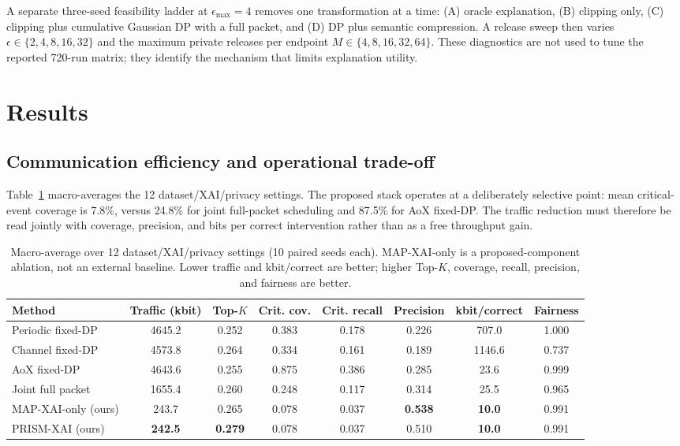 \documentclass[conference]{IEEEtran}
\newcommand{\method}{PRISM-XAI}
\newcommand{\mapxai}{MAP-XAI}
\begin{document}
A separate three-seed feasibility ladder at $\epsilon_{\max}=4$ removes
one transformation at a time: (A) oracle explanation, (B) clipping only,
(C) clipping plus cumulative Gaussian DP with a full packet, and (D) DP
plus semantic compression. A release sweep then varies
$\epsilon\in\{2,4,8,16,32\}$ and the maximum private releases per
endpoint $M\in\{4,8,16,32,64\}$. These diagnostics are not used to tune
the reported 720-run matrix; they identify the mechanism that limits
explanation utility.

\section{Results}

\subsection{Communication efficiency and operational trade-off}

Table~\ref{tab:main} macro-averages the 12 dataset/XAI/privacy settings.
The proposed stack operates at a deliberately selective point: mean
critical-event coverage is 7.8\%, versus 24.8\% for joint full-packet
scheduling and 87.5\% for AoX fixed-DP. The traffic reduction must
therefore be read jointly with coverage, precision, and bits per correct
intervention rather than as a free throughput gain.

\begin{table}[t]
\caption{Macro-average over 12 dataset/XAI/privacy settings (10 paired
seeds each). \mapxai{}-only is a proposed-component ablation, not an
external baseline. Lower traffic and kbit/correct are better; higher
Top-$K$, coverage, recall, precision, and fairness are better.}
\label{tab:main}
\centering
\footnotesize
\setlength{\tabcolsep}{4.1pt}
\begin{tabular}{lccccccc}
\toprule
Method & Traffic (kbit) & Top-$K$ & Crit. cov. & Crit. recall & Precision & kbit/correct & Fairness \\
\midrule
Periodic fixed-DP & 4645.2 & 0.252 & 0.383 & 0.178 & 0.226 & 707.0 & 1.000 \\
Channel fixed-DP & 4573.8 & 0.264 & 0.334 & 0.161 & 0.189 & 1146.6 & 0.737 \\
AoX fixed-DP & 4643.6 & 0.255 & 0.875 & 0.386 & 0.285 & 23.6 & 0.999 \\
Joint full packet & 1655.4 & 0.260 & 0.248 & 0.117 & 0.314 & 25.5 & 0.965 \\
\midrule
\mapxai{}-only (ours) & 243.7 & 0.265 & 0.078 & 0.037 & \textbf{0.538} & \textbf{10.0} & 0.991 \\
\method{} (ours) & \textbf{242.5} & \textbf{0.279} & 0.078 & 0.037 & 0.510 & \textbf{10.0} & 0.991 \\
\bottomrule
\end{tabular}
\end{table}
\end{document}
